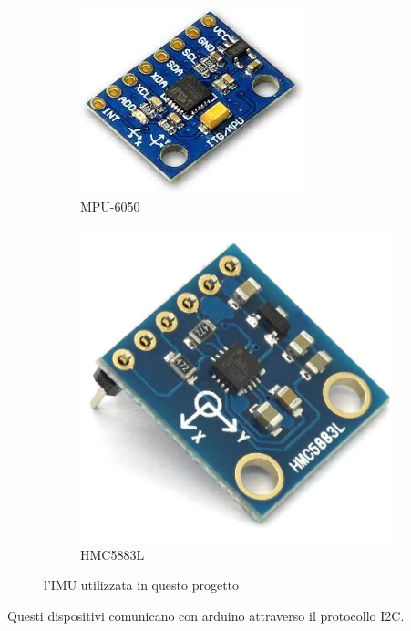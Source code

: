 \documentclass[10pt,a4paper]{article}
\begin{document}
\begin{figure}[h]
    \centering
    \begin{subfigure}[b]{0.3\textwidth}
        \includegraphics[height=0.75\textwidth]{MPU-6050.jpg}
        \caption{MPU-6050}
        \label{fig:MPU6050}
    \end{subfigure} 
    \begin{subfigure}[b]{0.3\textwidth}
        \includegraphics[height=0.75\textwidth]{HMC5883L.jpg}
        \caption{HMC5883L}
        \label{fig:HMC5883L}
    \end{subfigure}
    \caption{l'IMU utilizzata in questo progetto}
    \label{fig:imu}
\end{figure}

Questi dispositivi comunicano con arduino attraverso il protocollo I2C.
\end{document}
